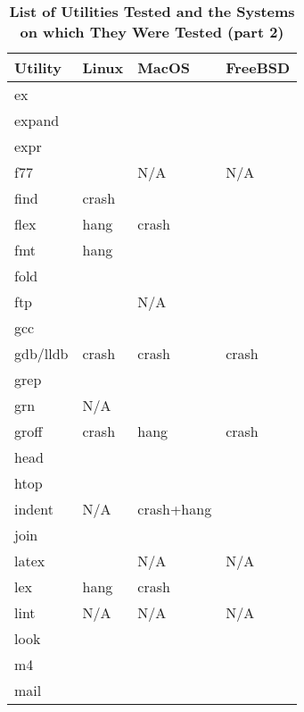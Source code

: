 \begin{table}[htbp]  %
\renewcommand\thetable{1}
\centering  %
 \begin{tabular}{|p{2.5cm}|p{2cm}|p{2cm}|p{2cm}|}  
     \hline
     \hline
        Utility & Linux & MacOS & FreeBSD \\ %
       \hline
       ex &   &   &    \\
       expand &   &   &    \\
       expr &   &   &    \\
       f77 &   & N/A  & N/A   \\
       find & crash  &   &    \\
       flex & hang  & crash  &    \\
       fmt & hang  &   &    \\
       fold &   &   &    \\
       ftp &   & N/A  &    \\
       gcc &   &   &    \\
       gdb/lldb & crash  & crash  &  crash  \\
       grep &   &   &    \\
       grn & N/A  &   &    \\
       groff & crash  & hang  &  crash  \\
       head &   &   &    \\
       htop &   &   &    \\
       indent & N/A  & crash+hang  &    \\
       join &   &   &    \\
       latex &   & N/A  &  N/A  \\
       lex & hang  & crash  &    \\
       lint & N/A  & N/A  & N/A   \\
       look &   &   &    \\
       m4 &   &   &    \\
       mail &   &   &    \\
       \hline
       \hline
   \end{tabular}
   \caption{\textbf{List of Utilities Tested and the Systems on which They Were Tested (part 2)}}  %
\end{table}




